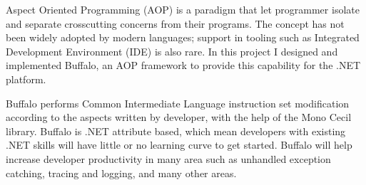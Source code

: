 \begin{abstractpage}
Aspect Oriented Programming (AOP) is a paradigm that let programmer isolate and separate crosscutting concerns from their programs. The concept has not been widely adopted by modern languages; support in tooling such as Integrated Development Environment (IDE) is also rare. In this project I designed and implemented Buffalo, an AOP framework to provide this capability for the .NET platform.

Buffalo performs Common Intermediate Language instruction set modification according to the aspects written by developer, with the help of the Mono Cecil library. Buffalo is .NET attribute based, which mean developers with existing .NET skills will have little or no learning curve to get started. Buffalo will help increase developer productivity in many area such as unhandled exception catching, tracing and logging, and many other areas.
\end{abstractpage}
